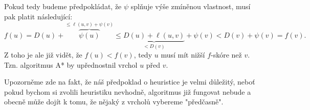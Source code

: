 Pokud tedy budeme předpokládat, že $\psi$ splňuje výše zmíněnou vlastnost, musí pak platit následující:
\[f(u)=D(u)+\overbrace{\psi(u)}^{\leqslant\ell(u,v)+\psi(v)}\leqslant \underbrace{D(u)+\ell(u,v)}_{<D(v)}+\psi(v)<D(v)+\psi(v)=f(v).\]
Z toho je ale již vidět, že $f(u)<f(v)$, tedy $u$ musí mít nižší $f$-skóre než $v$. Tzn. algoritmus A* by upřednostnil vrchol $u$ před $v$.

Upozorněme zde na fakt, že náš předpoklad o heuristice je velmi důležitý, neboť pokud bychom si zvolili heuristiku nevhodně, algoritmus již fungovat nebude a obecně může dojít k tomu, že nějaký z vrcholů vybereme "předčasně".